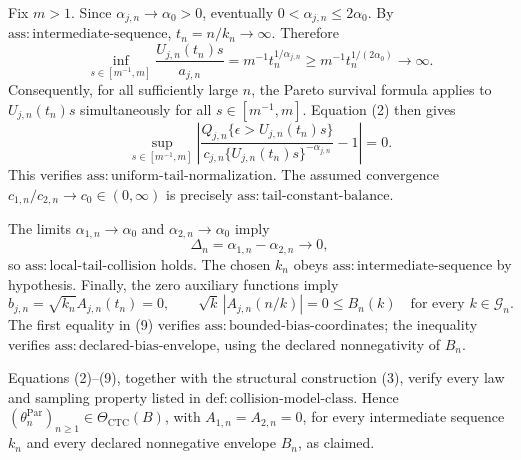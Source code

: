 Fix \(m>1\).  Since \(\alpha_{j,n}\to\alpha_0>0\), eventually \(0<\alpha_{j,n}\leq2\alpha_0\).  By \(\mathrm{ass:intermediate\text{-}sequence}\), \(t_n=n/k_n\to\infty\).  Therefore
\[
 \inf_{s\in[m^{-1},m]}
 \frac{U_{j,n}(t_n)s}{a_{j,n}}
 =m^{-1}t_n^{1/\alpha_{j,n}}
 \geq m^{-1}t_n^{1/(2\alpha_0)}\longrightarrow\infty. \tag{6}
\]
Consequently, for all sufficiently large \(n\), the Pareto survival formula applies to \(U_{j,n}(t_n)s\) simultaneously for all \(s\in[m^{-1},m]\).  Equation (2) then gives
\[
 \sup_{s\in[m^{-1},m]}
 \left|
 \frac{Q_{j,n}\{\epsilon>U_{j,n}(t_n)s\}}
 {c_{j,n}\{U_{j,n}(t_n)s\}^{-\alpha_{j,n}}}-1
 \right|=0. \tag{7}
\]
This verifies \(\mathrm{ass:uniform\text{-}tail\text{-}normalization}\).  The assumed convergence \(c_{1,n}/c_{2,n}\to c_0\in(0,\infty)\) is precisely \(\mathrm{ass:tail\text{-}constant\text{-}balance}\).

The limits \(\alpha_{1,n}\to\alpha_0\) and \(\alpha_{2,n}\to\alpha_0\) imply
\[
 \Delta_n=\alpha_{1,n}-\alpha_{2,n}\longrightarrow0, \tag{8}
\]
so \(\mathrm{ass:local\text{-}tail\text{-}collision}\) holds.  The chosen \(k_n\) obeys \(\mathrm{ass:intermediate\text{-}sequence}\) by hypothesis.  Finally, the zero auxiliary functions imply
\[
 b_{j,n}=\sqrt{k_n}A_{j,n}(t_n)=0,
 \qquad
 \sqrt{k}\,|A_{j,n}(n/k)|=0\leq B_n(k)
 \quad\text{for every }k\in\mathcal G_n. \tag{9}
\]
The first equality in (9) verifies \(\mathrm{ass:bounded\text{-}bias\text{-}coordinates}\); the inequality verifies \(\mathrm{ass:declared\text{-}bias\text{-}envelope}\), using the declared nonnegativity of \(B_n\).

Equations (2)--(9), together with the structural construction (3), verify every law and sampling property listed in \(\mathrm{def:collision\text{-}model\text{-}class}\).  Hence \((\theta_n^{\mathrm{Par}})_{n\geq1}\in\Theta_{\mathrm{CTC}}(B)\), with \(A_{1,n}=A_{2,n}=0\), for every intermediate sequence \(k_n\) and every declared nonnegative envelope \(B_n\), as claimed.